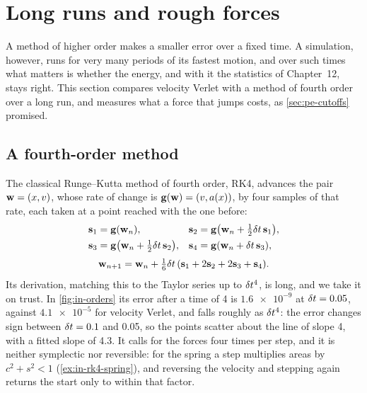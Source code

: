 \section{Long runs and rough forces}
\label{sec:in-long}

A method of higher order makes a smaller error over a fixed time. A
simulation, however, runs for very many periods of its fastest motion,
and over such times what matters is whether the energy, and with it the
statistics of Chapter~12, stays right. This section compares velocity Verlet with a method of fourth
order over a long run, and measures what a force that jumps costs, as
\cref{sec:pe-cutoffs} promised.

\subsection*{A fourth-order method}

The classical Runge--Kutta method of fourth order, RK4, advances the pair
$\bm{\mathrm{w}} = (x, v)$, whose rate of change is $\bm{\mathrm{g}}(\bm{\mathrm{w}}) = (v, a(x))$,
by four samples of that rate, each taken at a point reached with the one
before:
\begin{align*}
   \bm{\mathrm{s}}_1 &= \bm{\mathrm{g}}(\bm{\mathrm{w}}_n) , &
   \bm{\mathrm{s}}_2 &= \bm{\mathrm{g}}\bigl(\bm{\mathrm{w}}_n + \tfrac12\delta t\,\bm{\mathrm{s}}_1\bigr) ,\\
   \bm{\mathrm{s}}_3 &= \bm{\mathrm{g}}\bigl(\bm{\mathrm{w}}_n + \tfrac12\delta t\,\bm{\mathrm{s}}_2\bigr) , &
   \bm{\mathrm{s}}_4 &= \bm{\mathrm{g}}(\bm{\mathrm{w}}_n + \delta t\,\bm{\mathrm{s}}_3) ,
\end{align*}
\begin{equation*}
   \bm{\mathrm{w}}_{n+1} = \bm{\mathrm{w}}_n + \tfrac16\delta t\,(\bm{\mathrm{s}}_1 + 2\bm{\mathrm{s}}_2
   + 2\bm{\mathrm{s}}_3 + \bm{\mathrm{s}}_4) .
\end{equation*}
Its derivation, matching this to the Taylor series up to $\delta t^4$, is
long, and we take it on trust. In \cref{fig:in-orders} its error after a
time of 4 is $\num{1.6e-9}$ at $\delta t = 0.05$, against $\num{4.1e-5}$ for
velocity Verlet, and falls roughly as $\delta t^4$: the error changes sign
between $\delta t = 0.1$ and 0.05, so the points scatter about the line of
slope 4, with a fitted slope of 4.3. It calls for the forces four times
per step, and it is neither symplectic nor reversible: for the spring a
step multiplies areas by $c^2 + s^2 < 1$ (\cref{ex:in-rk4-spring}), and
reversing the velocity and stepping again returns the start only to
within that factor.

